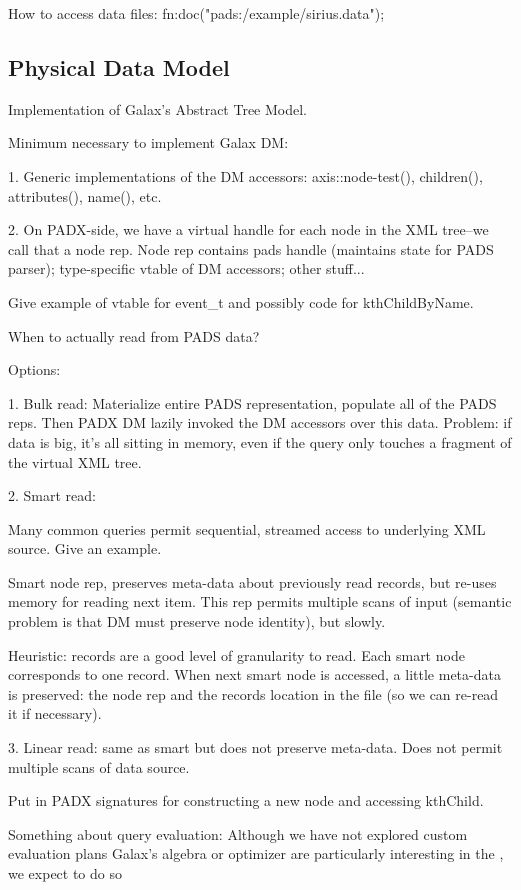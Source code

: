 How to access data files:  fn:doc("pads:/example/sirius.data");

\subsection{Physical Data Model}

Implementation of Galax's Abstract Tree Model.

Minimum necessary to implement Galax DM:

1. Generic implementations of the DM accessors: axis::node-test(), children(),
   attributes(), name(), etc. 

2. On PADX-side, we have a virtual handle for each node in the XML
   tree--we call that a node rep.  Node rep contains pads handle
   (maintains state for PADS parser); type-specific vtable of DM
   accessors; other stuff...

   Give example of vtable for event\_t and possibly code for
   kthChildByName. 

When to actually read from PADS data?

Options: 

1. Bulk read: Materialize entire PADS representation, populate all of the PADS
reps.  Then PADX DM lazily invoked the DM accessors over this data.
Problem: if data is big, it's all sitting in memory, even if the query
only touches a fragment of the virtual XML tree.

2. Smart read: 

Many common queries permit sequential, streamed access to underlying
XML source.  Give an example.  

Smart node rep, preserves meta-data about previously read records, but
re-uses memory for reading next item.  This rep permits multiple scans
of input (semantic problem is that DM must preserve node identity),
but slowly. 

Heuristic: records are a good level of granularity to read.   Each
smart node corresponds to one record.  When next smart node is
accessed, a little meta-data is preserved: the node rep and the
records location in the file (so we can re-read it if necessary).

3. Linear read: same as smart but does not preserve meta-data.
   Does not permit multiple scans of data source. 

Put in PADX signatures for constructing a new node and accessing
kthChild. 

Something about query evaluation:
Although we have not explored custom evaluation plans 
Galax's algebra or optimizer are particularly interesting in the 
\padx{}, we expect to do so 
